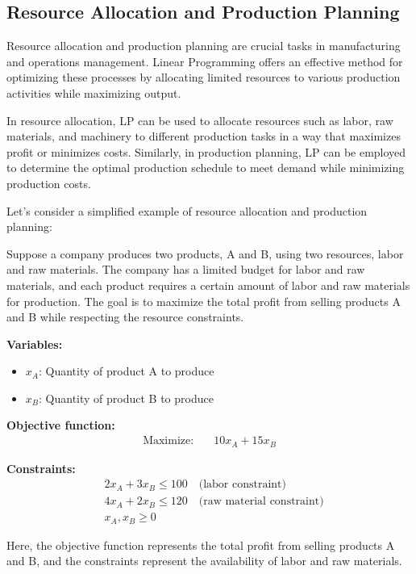 \documentclass[12pt]{book} %
\begin{document}
\subsection{Resource Allocation and Production Planning}

Resource allocation and production planning are crucial tasks in manufacturing and operations management. Linear Programming offers an effective method for optimizing these processes by allocating limited resources to various production activities while maximizing output.

In resource allocation, LP can be used to allocate resources such as labor, raw materials, and machinery to different production tasks in a way that maximizes profit or minimizes costs. Similarly, in production planning, LP can be employed to determine the optimal production schedule to meet demand while minimizing production costs.

Let's consider a simplified example of resource allocation and production planning:

Suppose a company produces two products, A and B, using two resources, labor and raw materials. The company has a limited budget for labor and raw materials, and each product requires a certain amount of labor and raw materials for production. The goal is to maximize the total profit from selling products A and B while respecting the resource constraints.

\textbf{Variables:}
\begin{itemize}
    \item \(x_A\): Quantity of product A to produce
    \item \(x_B\): Quantity of product B to produce
\end{itemize}

\textbf{Objective function:}
\begin{align*}
\text{Maximize:} \quad & 10x_A + 15x_B
\end{align*}

\textbf{Constraints:}
\begin{align*}
& 2x_A + 3x_B \leq 100 \quad \text{(labor constraint)} \\
& 4x_A + 2x_B \leq 120 \quad \text{(raw material constraint)} \\
& x_A, x_B \geq 0
\end{align*}

Here, the objective function represents the total profit from selling products A and B, and the constraints represent the availability of labor and raw materials.
\end{document}
